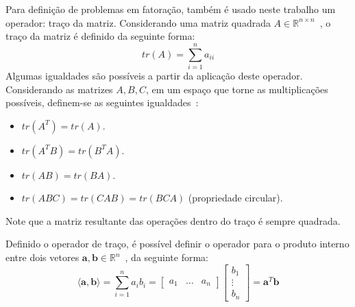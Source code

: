 \documentclass[
    12pt,                %
    oneside,            %
    a4paper,            %
    english,            %
    brazil                %
    ]{abntex2ppgsi}
\begin{document}
Para definição de problemas em fatoração, também é usado neste trabalho um operador: traço da matriz.
Considerando uma matriz quadrada $A \in \mathbb{R}^{n \times n}$~\cite{Magnus1999}, o traço da matriz é definido da seguinte forma:
\[
    tr(A) = \sum_{i=1}^n a_{ii}
\]
Algumas igualdades são possíveis a partir da aplicação deste operador.
Considerando as matrizes $A, B, C$, em um espaço que torne as multiplicações possíveis, definem-se as seguintes igualdades~\cite{Magnus1999}:
\begin{itemize}
    \item $tr(A^T) = tr(A)$.
    \item $tr(A^TB) = tr(B^TA)$.
    \item $tr(AB) = tr(BA)$.
    \item $tr(ABC) = tr(CAB) = tr(BCA)$ (propriedade circular).
\end{itemize}
Note que a matriz resultante das operações dentro do traço é sempre quadrada.

Definido o operador de traço, é possível definir o operador para o produto interno entre dois vetores $\mathbf{a}, \mathbf{b} \in \mathbb{R}^n$~\cite{Boyd2004}, da seguinte forma:
\[
    \langle \mathbf{a}, \mathbf{b} \rangle = \sum_{i=1}^n a_i b_i = \begin{bmatrix}
                                                                        a_{1} & \dots & a_{n}
                                                                    \end{bmatrix}
                                                                    \begin{bmatrix}
                                                                        b_{1}  \\
                                                                        \vdots \\
                                                                        b_{n}
                                                                    \end{bmatrix}
                                                                  = \mathbf{a}^T \mathbf{b}
\]
\end{document}
